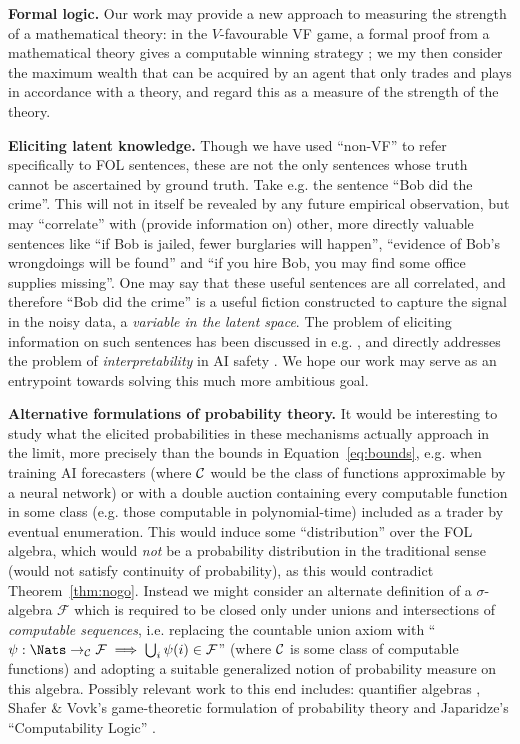 \textbf{Formal logic.} Our work may provide a new approach to measuring the strength of a mathematical theory: in the $V$-favourable VF game, a formal proof from a mathematical theory gives a computable winning strategy \cite{bonnayPreuvesJeuxSemantiques2004, boyerProofTruth2012}; we my then consider the maximum wealth that can be acquired by an agent that only trades and plays in accordance with a theory, and regard this as a measure of the strength of the theory.

\textbf{Eliciting latent knowledge.} Though we have used ``non-VF'' to refer specifically to FOL sentences, these are not the only sentences whose truth cannot be ascertained by ground truth. Take e.g. the sentence ``Bob did the crime''. This will not in itself be revealed by any future empirical observation, but may ``correlate'' with (provide information on) other, more directly valuable sentences like ``if Bob is jailed, fewer burglaries will happen'', ``evidence of Bob's wrongdoings will be found'' and ``if you hire Bob, you may find some office supplies missing''. One may say that these useful sentences are all correlated, and therefore ``Bob did the crime'' is a useful fiction constructed to capture the signal in the noisy data, a \emph{variable in the latent space}. The problem of eliciting information on such sentences has been discussed in e.g. \cite{tailcalledLatentVariablesPrediction2023, baillonBayesianMarketsElicit2017, baillonSimpleBetsElicit2021}, and directly addresses the problem of \emph{interpretability} in AI safety \cite{christianoElicitingLatentKnowledge2021}. We hope our work may serve as an entrypoint towards solving this much more ambitious goal.

\NewDocumentCommand{\toc}{}{\to_{\Compcl}}

\textbf{Alternative formulations of probability theory.} It would be interesting to study what the elicited probabilities in these mechanisms actually approach in the limit, more precisely than the bounds in Equation~\ref{eq:bounds}, e.g. when training AI forecasters (where $\mathcal{C}$ would be the class of functions approximable by a neural network) or with a double auction containing every computable function in some class (e.g. those computable in polynomial-time) included as a trader by eventual enumeration. This would induce some ``distribution'' over the FOL algebra, which would \emph{not} be a probability distribution in the traditional sense (would not satisfy continuity of probability), as this would contradict Theorem~\ref{thm:nogo}. Instead we might consider an alternate definition of a $\sigma$-algebra $\mathcal{F}$ which is required to be closed only under unions and intersections of \emph{computable sequences}, i.e. replacing the countable union axiom with ``$\psi:\Nats\toc\mathcal{F}\implies\bigcup_i\psi(i)\in\mathcal{F}$'' (where $\mathcal{C}$ is some class of computable functions) and adopting a suitable generalized notion of probability measure on this algebra. Possibly relevant work to this end includes: quantifier algebras \cite{cwooQuantifierAlgebra2013}, Shafer \& Vovk's game-theoretic formulation of probability theory \cite{shaferProbabilityFinanceIts2005, shaferGameTheoreticFoundationsProbability2019} and Japaridze's ``Computability Logic'' \cite{japaridzeBeginningWasGame2009, japaridzeSurveyComputabilityLogic2015}.
